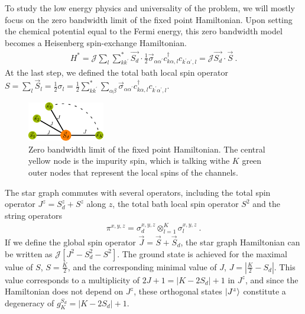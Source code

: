 \documentclass[reprint,prb,superscriptaddress]{revtex4-2}
\begin{document}
To study the low energy physics and universality of the problem, we will mostly focus on the zero bandwidth limit of the fixed point Hamiltonian. Upon setting the chemical potential equal to the Fermi energy, this zero bandwidth model becomes a Heisenberg spin-exchange Hamiltonian.
\begin{equation}\begin{aligned}
	\label{stargraph}
	H^* = {\mathcal{J}}\sum_l\sum_{kk^\prime}^* \vec{S_d}\cdot\frac{1}{2}\vec{\sigma}_{\alpha\alpha^\prime}c_{k\alpha,l}^\dagger c_{k^\prime\alpha^\prime, l} = {\mathcal{J}}\vec{S_d}\cdot\vec S~.
\end{aligned}\end{equation}
At the last step, we defined the total bath local spin operator \(S = \sum_l \vec{S}_l = \frac{1}{2}\sigma_l = \frac{1}{2}\sum_{kk^\prime}^*\sum_{\alpha\beta}\vec{\sigma}_{\alpha\alpha^\prime}c_{k\alpha,l}^\dagger c_{k^\prime\alpha^\prime, l}\).
\begin{figure}[htpb]
	\centering
	\includegraphics[width=0.30\textwidth]{plt/stargraph.pdf}
	\caption{Zero bandwidth limit of the fixed point Hamiltonian. The central yellow node is the impurity spin, which is talking withe \(K\) green outer nodes that represent the local spins of the channels.}
	\label{fig:stargraph}
\end{figure}
The star graph commutes with several operators, including the total spin operator \(J^z = S_d^z + S^z\) along \(z\), the total bath local spin operator \(S^2\) and the string operators 
\begin{equation}\begin{aligned}
\pi^{x,y,z} = \sigma_d^{x,y,z} \otimes_{l=1}^K \sigma_l^{x,y,z}~.
\end{aligned}\end{equation}
If we define the global spin operator \(\vec J = \vec S + \vec S_d\), the star graph Hamiltonian can be written as \(\mathcal{J}\left[J^2 - S_d^2 - S^2\right] \). The ground state is achieved for the maximal value of \(S\), \(S=\frac{K}{2}\), and the corresponding minimal value of \(J\), \(J = |\frac{K}{2} - S_d|\). This value corresponds to a multiplicity of \(2J+1 = |K - 2S_d|+1\) in \(J^z\), and since the Hamiltonian does not depend on \(J^z\), these orthogonal states \(\ket{J^z}\) constitute a degeneracy of \(g^{S_d}_K = |K - 2S_d|+1\).
\end{document}
